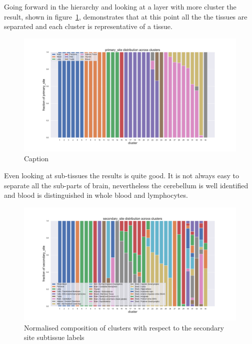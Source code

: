 Going forward in the hierarchy and looking at a layer with more cluster the result, shown in figure~\ref{fig:topic/gtex/oversigma_10tissue/fraction_clustercomposition_l2_primary_site}, demonstrates that at this point all the the tissues are separated and each cluster is representative of a tissue.
\begin{figure}[htb!]
    \centering
    \includegraphics[width=0.9\linewidth]{pictures/topic/gtex/oversigma_10tissue/fraction_clustercomposition_l2_primary_site.pdf}
    \caption{Caption}
    \label{fig:topic/gtex/oversigma_10tissue/fraction_clustercomposition_l2_primary_site}
\end{figure}
Even looking at sub-tissues the results is quite good. It is not always easy to separate all the sub-parts of brain, nevertheless the cerebellum is well identified and blood is distinguished in whole blood and lymphocytes.
\begin{figure}[htb!]
    \centering
    \includegraphics[width=0.9\linewidth]{pictures/topic/gtex/oversigma_10tissue/fraction_clustercomposition_l2_secondary_site.pdf}
    \caption{Normalised composition of clusters with respect to the secondary site subtissue labels}
    \label{fig:topic/gtex/oversigma_10tissue/fraction_clustercomposition_l2_secondary_site}
\end{figure}

